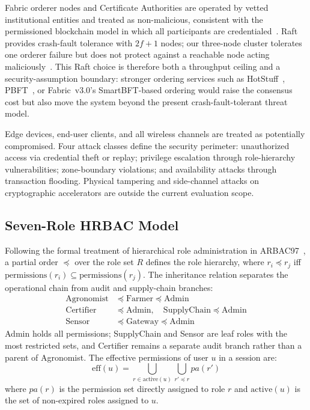 \documentclass[a4paper,fleqn]{cas-dc}
\begin{document}
Fabric orderer nodes and Certificate Authorities are operated by vetted
institutional entities and treated as non-malicious, consistent with
the permissioned blockchain model in which all participants are
credentialed~\cite{androulaki2018fabric}. Raft provides crash-fault
tolerance with $2f{+}1$ nodes; our three-node cluster tolerates one
orderer failure but does not protect against a reachable node acting
maliciously~\cite{ongaro2014raft}. This Raft choice is therefore both a
throughput ceiling and a security-assumption boundary: stronger ordering
services such as HotStuff~\cite{yin2019hotstuff},
PBFT~\cite{castro1999practical}, or Fabric~v3.0's SmartBFT-based
ordering would raise the consensus cost but also move the system beyond
the present crash-fault-tolerant threat model.

Edge devices, end-user clients, and all wireless channels are treated
as potentially compromised. Four attack classes define the security
perimeter: unauthorized access via credential theft or replay;
privilege escalation through role-hierarchy vulnerabilities;
zone-boundary violations; and availability attacks through transaction
flooding. Physical tampering and side-channel attacks on cryptographic
accelerators are outside the current evaluation scope.

\subsection{Seven-Role HRBAC Model}
\label{subsec:rbac}

Following the formal treatment of hierarchical role administration in
ARBAC97~\cite{sandhu1999arbac97}, a partial order $\preceq$ over the role
set $R$ defines the role hierarchy,
where $r_i \preceq r_j$ iff $\mathrm{permissions}(r_i) \subseteq
\mathrm{permissions}(r_j)$. The inheritance relation separates the
operational chain from audit and supply-chain branches:
\begin{align}
\mathrm{Agronomist} &\preceq \mathrm{Farmer} \preceq \mathrm{Admin}
\label{eq:ops_chain}\\
\mathrm{Certifier} &\preceq \mathrm{Admin}, \quad
\mathrm{SupplyChain} \preceq \mathrm{Admin}
\label{eq:audit_supply_branches}\\
\mathrm{Sensor} &\preceq \mathrm{Gateway} \preceq \mathrm{Admin}
\label{eq:device_chain}
\end{align}
Admin holds all permissions; SupplyChain and Sensor are leaf roles with
the most restricted sets, and Certifier remains a separate audit branch
rather than a parent of Agronomist. The effective permissions of user $u$
in a session are:
\[
\mathrm{eff}(u) = \bigcup_{r \in \mathrm{active}(u)}
  \bigcup_{r' \preceq r} pa(r')
\]
where $pa(r)$ is the permission set directly assigned to role $r$ and
$\mathrm{active}(u)$ is the set of non-expired roles assigned to $u$.
\end{document}
